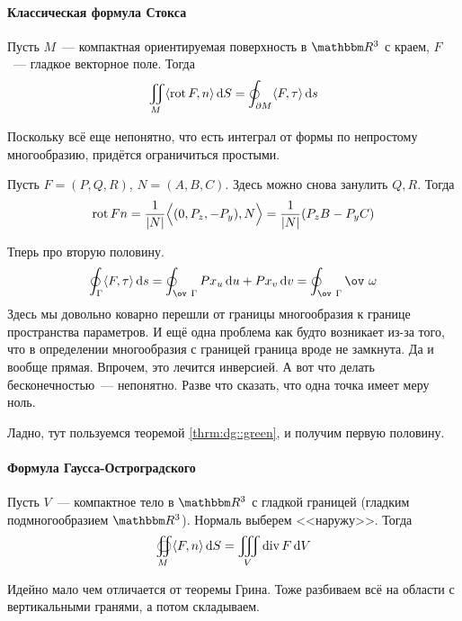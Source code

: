 \documentclass[draft,timbord]{longnotes}
\begin{document}
\paragraph{Классическая формула Стокса}
\label{par:dg::stocks}

\begin{thrm}\label{thrm:dg::stocks}
  Пусть $M$~--- компактная ориентируемая поверхность в $\R^3$ с краем, $F$~--- гладкое векторное
  поле.
  Тогда
  \[
    \iint_M \langle \operatorname{rot} F , n\rangle \, \mathrm{d} S = \oint_{\partial M} \langle F,\tau \rangle\, \mathrm{d} s
  \]
\end{thrm}

\begin{tproof}
  Поскольку всё еще непонятно, что есть интеграл от формы по непростому многообразию, придётся
  ограничиться простыми.

  Пусть $F = (P,Q,R)$, $N=(A,B,C)$.
  Здесь можно снова занулить $Q, R$.
  Тогда \[
    \operatorname{rot} F n = \frac{1}{|N|} \Bigl\langle (0, P_z, -P_y) , N \Bigr\rangle 
    = \frac{1}{|N|} ( P_z B - P_y C )
  \]

  Тперь про вторую половину. \[
    \oint_\Gamma \langle F,\tau \rangle \, \del s 
    = \oint_{\ov~ \Gamma} P x_u \, \del u + Px_v \,\del v  
    =\oint_{\ov~ \Gamma} \ov~\omega 
  \]
  Здесь мы довольно коварно перешли от границы многообразия к границе пространства параметров.
  И ещё одна проблема как будто возникает из-за того, что в определении многообразия с границей
  граница вроде не замкнута. Да и вообще прямая. Впрочем, это лечится инверсией. А вот что
  делать бесконечностью~--- непонятно. Разве что сказать, что одна точка имеет меру ноль.
  
  Ладно, тут пользуемся  теоремой \ref{thrm:dg::green}, и получим первую половину.
\end{tproof}

\paragraph{Формула Гаусса-Остроградского}
\label{par:dg::gaussost}


\begin{thrm}\label{thrm:dg::gaussost}
  Пусть $V$~--- компактное тело в $\R^3$ с гладкой границей (гладким подмногообразием $\R^3$).
  Нормаль выберем <<наружу>>.  Тогда
  \[
    \oiint_M \langle F,n \rangle\, \mathrm{d} S = \iiint_V \operatorname{div} F\, \mathrm{d} V
  \]
\end{thrm}

\begin{tproof}
  Идейно мало чем отличается от теоремы Грина. 
  Тоже разбиваем всё на области с вертикальными гранями, а потом складываем.
\end{tproof}
\end{document}
